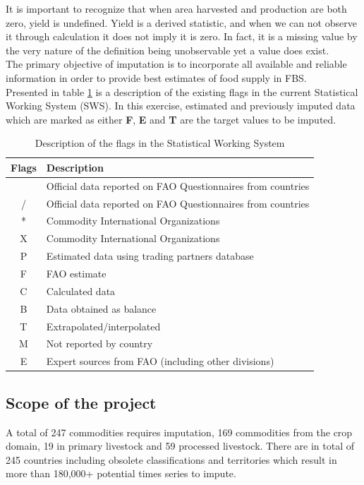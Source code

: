 \documentclass[nojss]{jss}\usepackage[]{graphicx}\usepackage[]{color}
\begin{document}
It is important to recognize that when area harvested and production
are both zero, yield is undefined. Yield is a derived statistic, and
when we can not observe it through calculation it does not imply it is
zero. In fact, it is a missing value by the very nature of the
definition being unobservable yet a value does exist.\\

The primary objective of imputation is to incorporate all
available and reliable information in order to provide best estimates of
food supply in FBS.\\

Presented in table \ref{tab:swsflag} is a description of the existing
flags in the current Statistical Working System (SWS). In this
exercise, estimated and previously imputed data which are marked as
either \textbf{F}, \textbf{E} and \textbf{T} are the target values to
be imputed.\\

\begin{table}[h!]
  \label{tab:swsflag}
  \caption{Description of the flags in the Statistical Working System}
  \begin{center}
    \begin{tabular}{|c||p{12cm}|}
      \hline
      Flags & Description\\
      \hline
      & Official data reported on FAO Questionnaires from countries\\
      / & Official data reported on FAO Questionnaires from countries\\
      * & Commodity International Organizations\\
      X & Commodity International Organizations\\
      P & Estimated data using trading partners database\\
      F & FAO estimate\\
      C & Calculated data\\
      B & Data obtained as balance\\
      T & Extrapolated/interpolated\\
      M & Not reported by country\\
      E & Expert sources from FAO (including other divisions)\\
      \hline
    \end{tabular}
  \end{center}  
\end{table}

\subsection{Scope of the project}
A total of 247 commodities requires imputation, 169 commodities from
the crop domain, 19 in primary livestock and 59 processed
livestock. There are in total of 245 countries including obsolete
classifications and territories which result in more than 180,000+
potential times series to impute.\\
\end{document}
